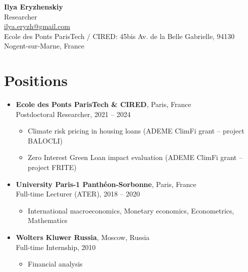 \documentclass[letterpaper,11pt]{article}
\begin{document}
\begin{center}
    {\LARGE \textbf{Ilya Eryzhenskiy}}\\
    \vspace{2mm}
    Researcher\\
    \href{mailto:ilya.eryzh@gmail.com}{ilya.eryzh@gmail.com}\\
    Ecole des Ponts ParisTech / CIRED: 45bis Av. de la Belle Gabrielle, 94130 Nogent-sur-Marne, France
\end{center}

\vspace{5mm}

\section*{Positions}
\begin{itemize}[leftmargin=*]
    \item \textbf{Ecole des Ponts ParisTech \& CIRED}, Paris, France\\
    Postdoctoral Researcher, 2021 -- 2024
    \begin{itemize}
        \item Climate risk pricing in housing loans (ADEME ClimFi grant -- project BALOCLI)
        \item Zero Interest Green Loan impact evaluation (ADEME ClimFi grant -- project FRITE)
    \end{itemize}

    \item \textbf{University Paris-1 Panthéon-Sorbonne}, Paris, France\\
    Full-time Lecturer (ATER), 2018 -- 2020
    \begin{itemize}
        \item International macroeconomics, Monetary economics, Econometrics, Mathematics
    \end{itemize}
    
    \item \textbf{Wolters Kluwer Russia}, Moscow, Russia\\
    Full-time Internship, 2010
    \begin{itemize}
        \item Financial analysis
    \end{itemize}
\end{itemize}
\end{document}
